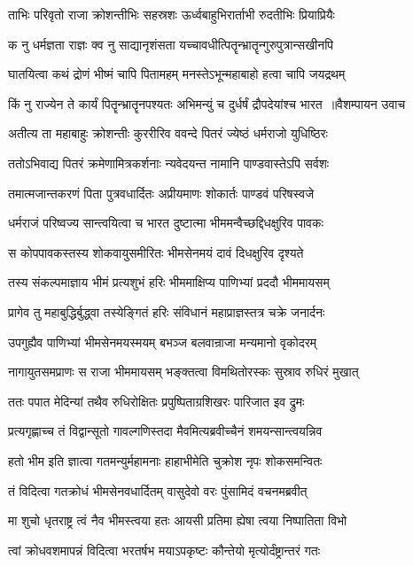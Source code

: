 \twolineshloka
{ताभिः परिवृतो राजा क्रोशन्तीभिः सहस्रशः}
{ऊर्ध्वबाहुभिरार्ताभी रुदतीभिः प्रियाप्रियैः}


\twolineshloka
{क नु धर्मज्ञता राज्ञः क्व नु साद्यानृशंसता}
{यच्चावधीत्पितॄन्भ्रातॄन्गुरुपुत्रान्सखीनपि}


\twolineshloka
{घातयित्वा कथं द्रोणं भीष्मं चापि पितामहम्}
{मनस्तेऽभून्महाबाहो हत्वा चापि जयद्रथम्}


\threelineshloka
{किं नु राज्येन ते कार्यं पितॄन्भ्रातॄनपश्यतः}
{अभिमन्युं च दुर्धर्षं द्रौपदेयांश्च भारत ॥वैशम्पायन उवाच}
{}


\twolineshloka
{अतीत्य ता महाबाहुः क्रोशन्तीः कुररीरिव}
{ववन्दे पितरं ज्येष्ठं धर्मराजो युधिष्ठिरः}


\twolineshloka
{ततोऽभिवाद्य पितरं क्रमेणामित्रकर्शनाः}
{न्यवेदयन्त नामानि पाण्डवास्तेऽपि सर्वशः}


\twolineshloka
{तमात्मजान्तकरणं पिता पुत्रवधार्दितः}
{अप्रीयमाणः शोकार्तः पाण्डवं परिषस्वजे}


\twolineshloka
{धर्मराजं परिष्वज्य सान्त्वयित्वा च भारत}
{दुष्टात्मा भीममन्वैच्छद्दिधक्षुरिव पावकः}


\twolineshloka
{स कोपपावकस्तस्य शोकवायुसमीरितः}
{भीमसेनमयं दावं दिधक्षुरिव दृश्यते}


\twolineshloka
{तस्य संकल्पमाज्ञाय भीमं प्रत्यशुभं हरिः}
{भीममाक्षिप्य पाणिभ्यां प्रददौ भीममायसम्}


\twolineshloka
{प्रागेव तु महाबुद्धिर्बुद्ध्वा तस्येङ्गितं हरिः}
{संविधानं महाप्राज्ञस्तत्र चक्रे जनार्दनः}


\twolineshloka
{उपगुह्यैव पाणिभ्यां भीमसेनमयस्मयम्}
{बभञ्ज बलवान्राजा मन्यमानो वृकोदरम्}


\twolineshloka
{नागायुतसमप्राणः स राजा भीममायसम्}
{भङ्क्तत्वा विमथितोरस्कः सुस्राव रुधिरं मुखात्}


\twolineshloka
{ततः पपात मेदिन्यां तथैव रुधिरोक्षितः}
{प्रपुष्पिताग्रशिखरः पारिजात इव द्रुमः}


\twolineshloka
{प्रत्यगृह्णाच्च तं विद्वान्सूतो गावल्गणिस्तदा}
{मैवमित्यब्रवीच्चैनं शमयन्सान्त्वयन्निव}


\twolineshloka
{हतो भीम इति ज्ञात्वा गतमन्युर्महामनाः}
{हाहाभीमेति चुक्रोश नृपः शोकसमन्वितः}


\twolineshloka
{तं विदित्वा गतक्रोधं भीमसेनवधार्दितम्}
{वासुदेवो वरः पुंसामिदं वचनमब्रवीत्}


\twolineshloka
{मा शुचो धृतराष्ट्र त्वं नैव भीमस्त्वया हतः}
{आयसी प्रतिमा ह्येषा त्वया निष्पातिता विभो}


\twolineshloka
{त्वां क्रोधवशमापन्नं विदित्वा भरतर्षभ}
{मयाऽपकृष्टः कौन्तेयो मृत्योर्दंष्ट्रान्तरं गतः}


